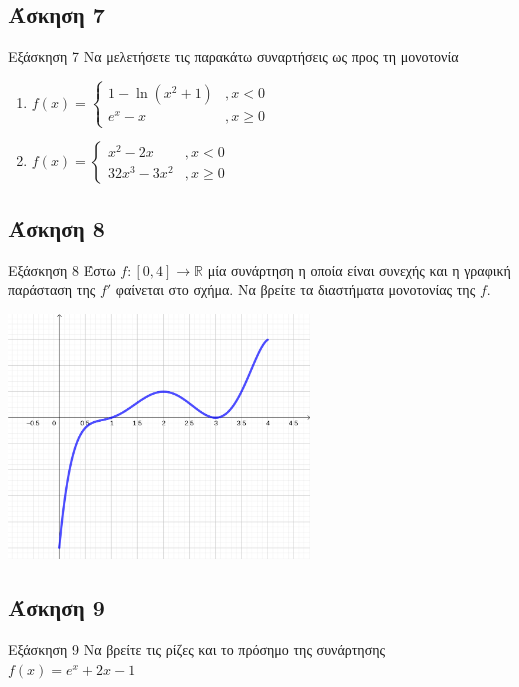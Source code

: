 \documentclass[greek]{beamer}
\begin{document}
\subsection{Άσκηση 7}
\begin{frame}[label=Άσκηση7]{Εξάσκηση 7}
 Να μελετήσετε τις παρακάτω συναρτήσεις ως προς τη μονοτονία
 \begin{enumerate}
  \item<1-> $f(x)=\begin{cases}
    1-\ln (x^2+1) &,x<0 \\
    e^x-x &,x\ge 0
  \end{cases}$
   \item<2-> $f(x)=\begin{cases}
     x^2-2x &,x<0 \\
     32x^3-3x^2 &,x\ge 0
   \end{cases}$
 \end{enumerate}

\end{frame}

\subsection{Άσκηση 8}
\begin{frame}[label=Άσκηση8]{Εξάσκηση 8}
 Έστω $f:[0,4]\to\mathbb{R}$ μία συνάρτηση η οποία είναι συνεχής και η γραφική παράσταση της $f'$ φαίνεται στο σχήμα. Να βρείτε τα διαστήματα μονοτονίας της $f$.

 \centering
 \includegraphics[width=0.6\textwidth]{"images/2.6.2 Μονοτονία.png"}

\end{frame}

\subsection{Άσκηση 9}
\begin{frame}[label=Άσκηση9]{Εξάσκηση 9}
 Να βρείτε τις ρίζες και το πρόσημο της συνάρτησης $f(x)=e^x+2x-1$

\end{frame}
\end{document}

